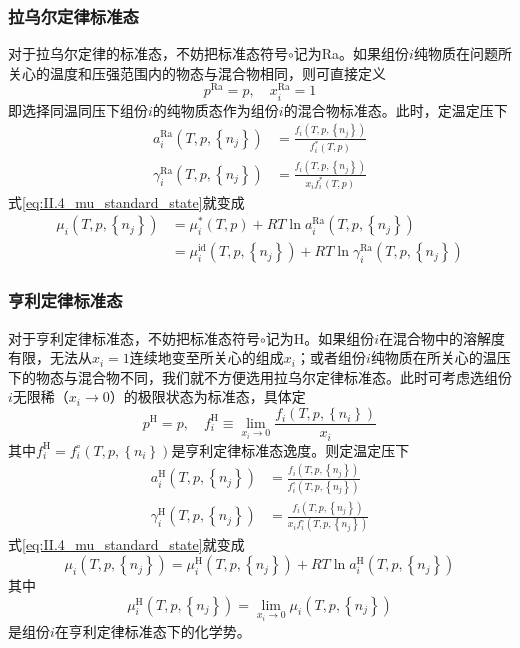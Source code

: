 \documentclass[main.tex]{subfiles}
\begin{document}
\subsubsection{拉乌尔定律标准态}
对于拉乌尔定律的标准态，不妨把标准态符号$\circ$记为Ra。如果组份$i$纯物质在问题所关心的温度和压强范围内的物态与混合物相同，则可直接定义
\[p^\text{Ra}=p,\quad x^\text{Ra}_i=1\]
即选择同温同压下组份$i$的纯物质态作为组份$i$的混合物标准态。此时，定温定压下
\begin{align*}
  a_i^\text{Ra}\left(T,p,\left\{n_j\right\}\right)      & =\frac{f_i\left(T,p,\left\{n_j\right\}\right)}{f_i^*\left(T,p\right)}    \\
  \gamma_i^\text{Ra}\left(T,p,\left\{n_j\right\}\right) & =\frac{f_i\left(T,p,\left\{n_j\right\}\right)}{x_if_i^*\left(T,p\right)}
\end{align*}
式\eqref{eq:II.4_mu_standard_state}就变成
\begin{align}
  \mu_i\left(T,p,\left\{n_j\right\}\right) & =\mu_i^*\left(T,p\right)+RT\ln a_i^\text{Ra}\left(T,p,\left\{n_j\right\}\right)\label{eq:II.4_Raoult_standard_state_activity}                                       \\
                                           & =\mu_i^\text{id}\left(T,p,\left\{n_j\right\}\right)+RT\ln\gamma_i^\text{Ra}\left(T,p,\left\{n_j\right\}\right)\label{eq:II.4_Raoult_standard_state_activity_factor}
\end{align}

\subsubsection{亨利定律标准态}
对于亨利定律标准态，不妨把标准态符号$\circ$记为H。如果组份$i$在混合物中的溶解度有限，无法从$x_i=1$连续地变至所关心的组成$x_i$；或者组份$i$纯物质在所关心的温压下的物态与混合物不同，我们就不方便选用拉乌尔定律标准态。此时可考虑选组份$i$无限稀（$x_i\rightarrow 0$）的极限状态为标准态，具体定
\[p^\text{H}=p,\quad f_i^\text{H}\equiv\lim_{x_i\to 0}\frac{f_i\left(T,p,\left\{n_i\right\}\right)}{x_i}\]
其中$f_i^\text{H}=f_i^\circ\left(T,p,\left\{n_i\right\}\right)$是亨利定律标准态逸度。则定温定压下
\begin{align*}
  a_i^\text{H}\left(T,p,\left\{n_j\right\}\right)      & =\frac{f_i\left(T,p,\left\{n_j\right\}\right)}{f_i^\circ\left(T,p,\left\{n_j\right\}\right)}    \\
  \gamma_i^\text{H}\left(T,p,\left\{n_j\right\}\right) & =\frac{f_i\left(T,p,\left\{n_j\right\}\right)}{x_if_i^\circ\left(T,p,\left\{n_j\right\}\right)}
\end{align*}
式\eqref{eq:II.4_mu_standard_state}就变成
\begin{equation}\label{eq:II.4_Henry_standard_state_activity}
  \mu_i\left(T,p,\left\{n_j\right\}\right) =\mu_i^\text{H}\left(T,p,\left\{n_j\right\}\right)+RT\ln a_i^\text{H}\left(T,p,\left\{n_j\right\}\right)
\end{equation}
其中
\[\mu_i^\text{H}\left(T,p,\left\{n_j\right\}\right)=\lim_{x_i\to 0}\mu_i\left(T,p,\left\{n_j\right\}\right)\]
是组份$i$在亨利定律标准态下的化学势。
\end{document}
